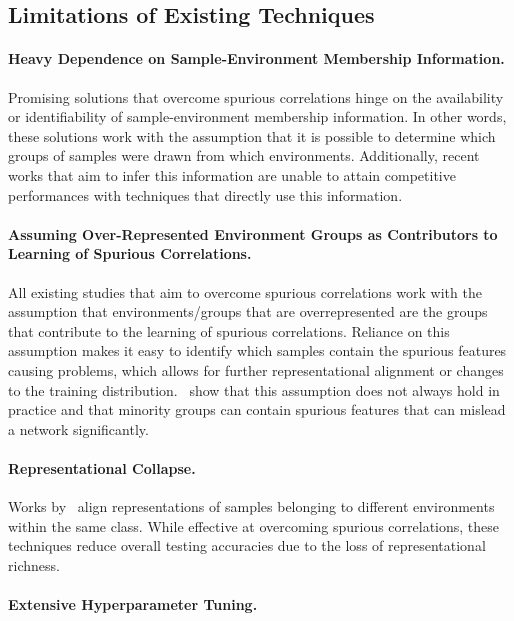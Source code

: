 \subsection{Limitations of Existing Techniques}

\paragraph{Heavy Dependence on Sample-Environment Membership Information.}

Promising solutions that overcome spurious correlations hinge on the availability or identifiability of sample-environment membership information. In other words, these solutions work with the assumption that it is possible to determine which groups of samples were drawn from which environments. Additionally, recent works that aim to infer this information are unable to attain competitive performances with techniques that directly use this information.

\paragraph{Assuming Over-Represented Environment Groups as Contributors to Learning of Spurious Correlations.}

All existing studies that aim to overcome spurious correlations work with the assumption that environments/groups that are overrepresented are the groups that contribute to the learning of spurious correlations. Reliance on this assumption makes it easy to identify which samples contain the spurious features causing problems, which allows for further representational alignment or changes to the training distribution.~\cite{Mulchandani2025ICLR} show that this assumption does not always hold in practice and that minority groups can contain spurious features that can mislead a network significantly.

\paragraph{Representational Collapse.}

Works by~\cite{Ahmed2021ICLR,Zhang2022ICML} align representations of samples belonging to different environments within the same class. While effective at overcoming spurious correlations, these techniques reduce overall testing accuracies due to the loss of representational richness.

\paragraph{Extensive Hyperparameter Tuning.}

